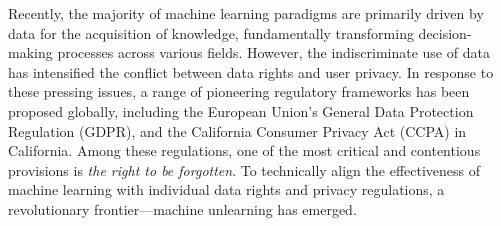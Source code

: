 

Recently, the majority of machine learning paradigms are primarily driven by data for the acquisition of knowledge, fundamentally transforming decision-making processes across various fields. However, the indiscriminate use of data has intensified the conflict between data rights and user privacy. In response to these pressing issues, a range of pioneering regulatory frameworks has been proposed globally, including the European Union’s General Data Protection Regulation (GDPR)\cite{GDPR}, and the California Consumer Privacy Act (CCPA)\cite{CCPA1} in California.
Among these regulations, one of the most critical and contentious provisions is \emph{the right to be forgotten}\cite{kwak2017let}. To technically align the effectiveness of machine learning with individual data rights and privacy regulations, a revolutionary frontier—machine unlearning\cite{Cao2015Towards,Xu2023ACMMU} has emerged.

